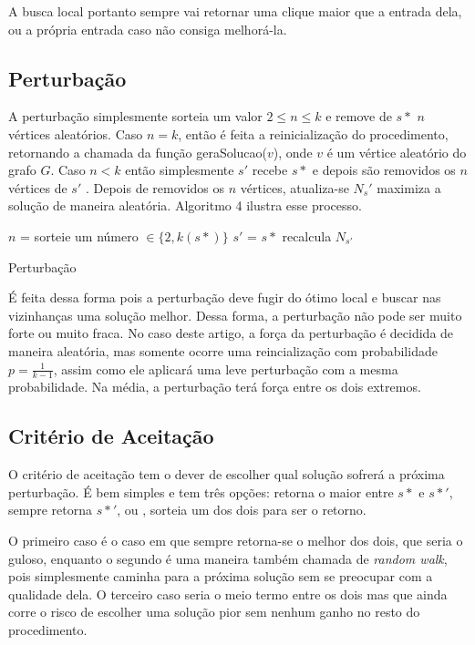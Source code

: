 \documentclass{article}
\begin{document}
A busca local portanto sempre vai retornar uma clique maior que a entrada dela, ou a própria entrada caso não consiga melhorá-la. 

\subsection{Perturbação}

A perturbação simplesmente sorteia um valor $2 \leq n \leq k$ e remove de $s*$ $n$ vértices aleatórios. Caso $n = k$, então é feita a reinicialização do procedimento, retornando a chamada da função geraSolucao($v$), onde $v$ é um vértice aleatório do grafo $G$. Caso $n < k$ então simplesmente $s'$ recebe $s*$ e depois são removidos os $n$ vértices de $s'$ . Depois de removidos os $n$ vértices, atualiza-se $N_s'$ maximiza a solução de maneira aleatória. Algoritmo 4 ilustra esse processo.\par

\begin{algorithm}
 $n$ = sorteie um número $\in \{2,k(s*)\}$\;
 $s'$ = $s*$\;
 recalcula $N_{s'}$\;
 \caption{Perturbação}
\end{algorithm}


É feita dessa forma pois a perturbação deve fugir do ótimo local e buscar nas vizinhanças uma solução melhor. Dessa forma, a perturbação não pode ser muito forte ou muito fraca. No caso deste artigo, a força da perturbação é decidida de maneira aleatória, mas somente ocorre uma reincialização com probabilidade $p = \frac{1}{k-1}$, assim como ele aplicará uma leve perturbação com a mesma probabilidade. Na média, a perturbação terá força entre os dois extremos.

\subsection{Critério de Aceitação}

O critério de aceitação tem o dever de escolher qual solução sofrerá a próxima perturbação. É bem simples e tem três opções: retorna o maior entre $s*$ e $s*'$, sempre retorna $s*'$, ou , sorteia um dos dois para ser o retorno. \par

O primeiro caso é o caso em que sempre retorna-se o melhor dos dois, que seria o guloso, enquanto o segundo é uma maneira também chamada de \textit{random walk}, pois simplesmente caminha para a próxima solução sem se preocupar com a qualidade dela. O terceiro caso seria o meio termo entre os dois mas que ainda corre o risco de escolher uma solução pior sem nenhum ganho no resto do procedimento.\par
\end{document}
